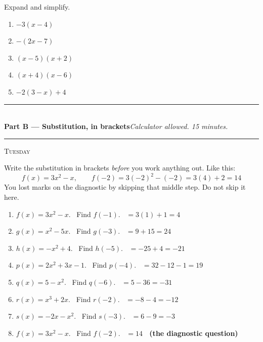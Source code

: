 \documentclass[11pt,a4paper]{article}
\newif\ifANSWERS
\newcommand{\PartHead}[2]{%
  \vspace{6pt}
  {\color{navy}\rule{\textwidth}{0.8pt}}\\[2pt]
  {\large\bfseries\color{navy}#1}\hfill{\small\itshape #2}\\[-4pt]
  {\color{navy}\rule{\textwidth}{0.4pt}}
  \vspace{4pt}
}
\newcommand{\sitting}[1]{{\footnotesize\textsc{\color{navy}#1}}\par\vspace{2pt}}
\newcommand{\ans}[1]{\ {\color{keyred}\bfseries #1}}
\newcommand{\note}[1]{\par{\footnotesize\color{keyred}#1}}
\newcommand{\ans}[1]{}
\newcommand{\note}[1]{}
\begin{document}
Expand and simplify.
\begin{enumerate}[leftmargin=20pt,itemsep=6pt,start=16]
\item $-3(x-4)$ \ifANSWERS\ans{$=-3x+12$}\else\ \underline{\hspace{6cm}}\fi
\item $-(2x-7)$ \ifANSWERS\ans{$=-2x+7$}\else\ \underline{\hspace{6cm}}\fi
\item $(x-5)(x+2)$ \ifANSWERS\ans{$=x^2-3x-10$}\else\ \underline{\hspace{5.4cm}}\fi
\item $(x+4)(x-6)$ \ifANSWERS\ans{$=x^2-2x-24$}\else\ \underline{\hspace{5.4cm}}\fi
\item $-2(3-x)+4$ \ifANSWERS\ans{$=2x-2$}\else\ \underline{\hspace{5.4cm}}\fi
\end{enumerate}

\ifANSWERS
\note{\textbf{Marking rule: below 17 of 20 means the sign work has not landed.} Open Session 3 with more of Part A rather than moving on. Items 6--8 and 15 are the diagnostic ones: they separate a student who knows the rule from one who has memorised a slogan.}
\fi

\newpage
\PartHead{Part B --- Substitution, in brackets}{Calculator allowed. 15 minutes.}
\sitting{Tuesday}
Write the substitution in brackets \emph{before} you work anything out. Like this:
\[
f(x)=3x^2-x,\qquad f(-2)=3(-2)^2-(-2)=3(4)+2=14
\]
You lost marks on the diagnostic by skipping that middle step. Do not skip it here.

\begin{multicols}{2}
\begin{enumerate}[leftmargin=20pt,itemsep=7pt]
\item $f(x)=3x^2-x$. \ Find $f(-1)$. \ans{$=3(1)+1=4$}
\item $g(x)=x^2-5x$. \ Find $g(-3)$. \ans{$=9+15=24$}
\item $h(x)=-x^2+4$. \ Find $h(-5)$. \ans{$=-25+4=-21$}
\item $p(x)=2x^2+3x-1$. \ Find $p(-4)$. \ans{$=32-12-1=19$}
\item $q(x)=5-x^2$. \ Find $q(-6)$. \ans{$=5-36=-31$}
\item $r(x)=x^3+2x$. \ Find $r(-2)$. \ans{$=-8-4=-12$}
\item $s(x)=-2x-x^2$. \ Find $s(-3)$. \ans{$=6-9=-3$}
\item $f(x)=3x^2-x$. \ Find $f(-2)$. \ans{$=14$ \ (the diagnostic question)}
\end{enumerate}
\end{multicols}
\end{document}
